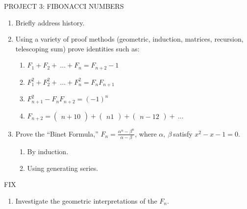 \documentclass[10pt,letter]{article}
\begin{document}
PROJECT 3: FIBONACCI NUMBERS
\begin{enumerate}
\def\labelenumi{\arabic{enumi}.}

\item
  Briefly address history.
\item
  Using a variety of proof methods (geometric, induction, matrices,
  recursion, telescoping sum) prove identities such as:
\begin{enumerate}
  \def\labelenumii{\alph{enumii}.}

  \item
    \(F_{1} + F_{2} + \ \ldots + F_{n} = F_{n + 2} - 1\)
  \item
    \(F_{1}^{2} + F_{2}^{2} + \ \ldots + F_{n}^{2} = F_{n}F_{n + 1}\)
  \item
    \(F_{n + 1}^{2} - F_{n}F_{n + 2} = \left( - 1 \right)^{n}\)
  \item
    \(F_{n + 2} =
\begin{pmatrix}
    n + 1
    0
    \end{pmatrix}
 +
\begin{pmatrix}
    n
    1
    \end{pmatrix}
 +
\begin{pmatrix}
    n - 1
    2
    \end{pmatrix}
 + \ \ldots\)

\end{enumerate}
\item
  Prove the ``Binet Formula,''
  \(F_{n} = \frac{\alpha^{n} - \beta^{n}}{\alpha - \beta}\), where
  \(\alpha,\ \beta\ \)satisfy \(x^{2} - x - 1 = 0\).
\begin{enumerate}
  \def\labelenumii{\alph{enumii}.}

  \item
    By induction.
  \item
    Using generating series.

\end{enumerate}

\end{enumerate}
FIX
\begin{enumerate}
\def\labelenumi{\arabic{enumi}.}

\item
  Investigate the geometric interpretations of the \(F_{n}\).

\end{enumerate}
\end{document}
